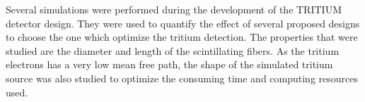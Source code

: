 Several simulations were performed during the development of the TRITIUM detector design. They were used to quantify the effect of several proposed designs to choose the one which optimize the tritium detection. The properties that were studied are the diameter and length of the scintillating fibers. As the tritium electrons has a very low mean free path, the shape of the simulated tritium source was also studied to optimize the consuming time and computing resources used. 


